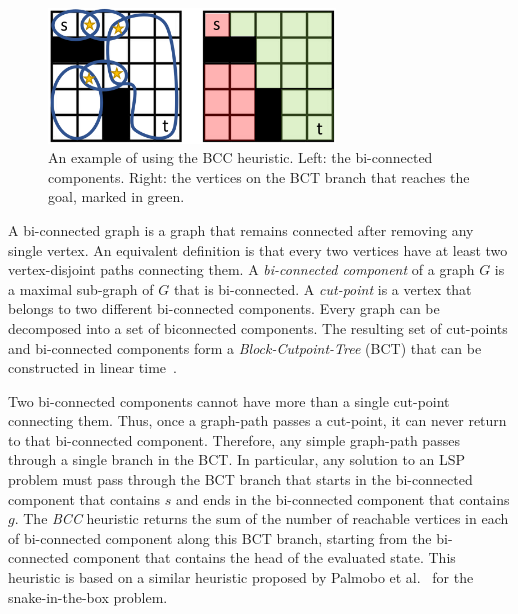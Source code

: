\documentclass[letterpaper]{article} %
\newcommand\Yossi[1]{\nb{\textbf{Yossi:}}{green}{#1}}
\begin{document}
\begin{figure}[ht!]
  \centering
  \includegraphics[width=3in]{fig/h_example_bcc2.png}
  \caption{An example of using the BCC heuristic. Left: the bi-connected components. Right: the vertices on the BCT branch that reaches the goal, marked in green.}
  \label{fig:h_example_bcc}
\end{figure}

A bi-connected graph is a graph that remains connected after removing any single vertex. An equivalent definition is that every two vertices have at least two vertex-disjoint paths connecting them. A {\em bi-connected component} of a graph $G$ is a maximal sub-graph of $G$ that is bi-connected. A {\em cut-point} is a vertex that belongs to two different bi-connected components.
Every graph can be decomposed into a set of biconnected components.
The resulting set of cut-points and bi-connected components form a {\em Block-Cutpoint-Tree} (BCT) that can be constructed in linear time~\cite{harary1966block,hopcroft1973algorithm}.

Two bi-connected components cannot have more than a single cut-point connecting them. Thus, once a graph-path passes a cut-point, it can never return to that bi-connected component.
Therefore, any simple graph-path passes through a single branch in the BCT.
In particular, any solution to an LSP problem must pass through the BCT branch that starts in the bi-connected component that contains $s$ and ends in the bi-connected component that contains $g$.
The {\em BCC} heuristic returns the sum of the number of reachable vertices in each of bi-connected component along this BCT branch, starting from the bi-connected component that contains the head of the evaluated state.  This heuristic is based on a similar heuristic proposed by Palmobo et al.~ for the snake-in-the-box problem.
\end{document}
